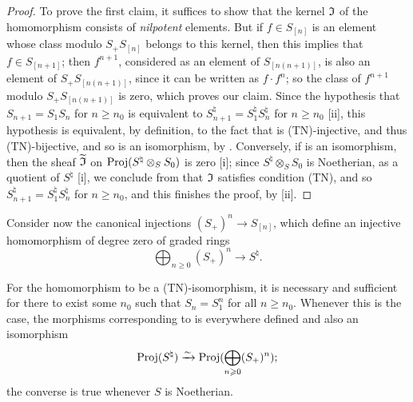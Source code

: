 \begin{proof}
\label{proof:2.8.2.12}
To prove the first claim, it suffices  to show that the kernel $\mathfrak{I}$ of the homomorphism  consists of \emph{nilpotent} elements.
But if $f\in S_{[n]}$ is an element whose class modulo $S_+S_{[n]}$ belongs to this kernel, then this implies that $f\in S_{[n+1]}$;
then $f^{n+1}$, considered as an element of $S_{[n(n+1)]}$, is also an element of $S_+S_{[n(n+1)]}$, since it can be written as $f\cdot f^n$;
so the class of $f^{n+1}$ modulo $S_+S_{[n(n+1)]}$ is zero, which proves our claim.
Since the hypothesis that $S_{n+1}=S_1S_n$ for $n\geq n_0$ is equivalent to $S_{n+1}^\natural=S_1^\natural S_n^\natural$ for $n\geq n_0$ [ii], this hypothesis is equivalent, by definition, to the fact that  is (TN)-injective, and thus (TN)-bijective, and so  is an isomorphism, by .
Conversely, if  is an isomorphism, then the sheaf $\widetilde{\mathfrak{I}}$ on $\operatorname{Proj}(S^\natural\otimes_S S_0)$ is zero [i];
since $S^\natural\otimes_S S_0$ is Noetherian, as a quotient of $S^\natural$ [i], we conclude from  that $\mathfrak{I}$ satisfies condition (TN), and so $S_{n+1}^\natural=S_1^\natural S_n^\natural$ for $n\geq n_0$, and this finishes the proof, by [ii].
\end{proof}

\begin{env}[8.2.13]
\label{2.8.2.13}
Consider now the canonical injections $(S_+)^n\to S_{[n]}$, which define an injective homomorphism of degree zero of graded rings
\[
\label{eq:2.8.2.13.1}
  \bigoplus_{n\geq0} (S_+)^n \to S^\natural.
\tag{8.2.13.1}
\]
\end{env}

\begin{proposition}[8.2.14]
\label{2.8.2.14}
For the homomorphism  to be a (TN)-isomorphism, it is necessary and sufficient for there to exist some $n_0$ such that $S_n=S_1^n$ for all $n\geq n_0$.
Whenever this is the case, the morphisms corresponding to  is everywhere defined and also an isomorphism
\[
  \operatorname{Proj}(S^\natural) \xrightarrow{\sim} \operatorname{Proj}(\bigoplus_{n\geqslant0}(S_+)^n);
\]
the converse is true whenever $S$ is Noetherian.
\end{proposition}


